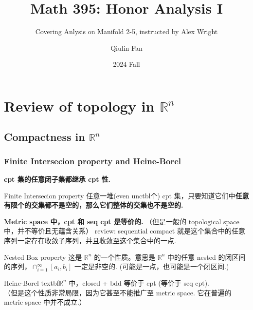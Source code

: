 \documentclass[lang=cn,11pt]{elegantbook}
\title{Math 395: Honor Analysis I}
\subtitle{Covering Anlysis on Manifold 2-5, instructed by Alex Wright}
\author{Qiulin Fan}
\date{2024 Fall}
\begin{document}
\maketitle
\frontmatter
\tableofcontents

\mainmatter

\chapter{Review of topology in $\mathbb{R}^n$}


\section{Compactness in $\mathbb{R}^n$}
\subsection{Finite Intersecion property and Heine-Borel}
\begin{theorem}
    \textbf{cpt 集的任意闭子集都继承 cpt 性.}
\end{theorem}

\begin{theorem}{Finite Intersecion property} \label{Finite Intersecion property}
   任意一堆(even unctbl个) cpt 集，只要知道它们中\textbf{任意有限个的交集都不是空的，那么它们整体的交集也不是空的. }
\end{theorem}


\begin{theorem}
    \textbf{Metric space 中，cpt 和 seq cpt 是等价的.}
    （但是一般的 topological space 中，并不等价且无蕴含关系）
    review: sequential compact 就是这个集合中的任意序列一定存在收敛子序列，并且收敛至这个集合中的一点.
\end{theorem}

\begin{theorem}{Nested Box property} \label{Nested Box property}
    这是 $\mathbb{R}^n$ 的一个性质。意思是 $\mathbb{R}^n$ 中的任意 nested 的闭区间的序列，$\cap_{i=1} ^\infty [a_i, b_i]$ 一定是非空的. (可能是一点，也可能是一个闭区间.) 
\end{theorem}

\begin{theorem}{Heine-Borel} \label{Heine-Borel}
    textbf{$\mathbb{R}^n$ 中，closed + bdd 等价于 cpt (等价于 seq cpt).} \\
（但是这个性质非常局限，因为它甚至不能推广至 metric space. 它在普遍的 metric space 中并不成立.）
\end{theorem}
\end{document}
